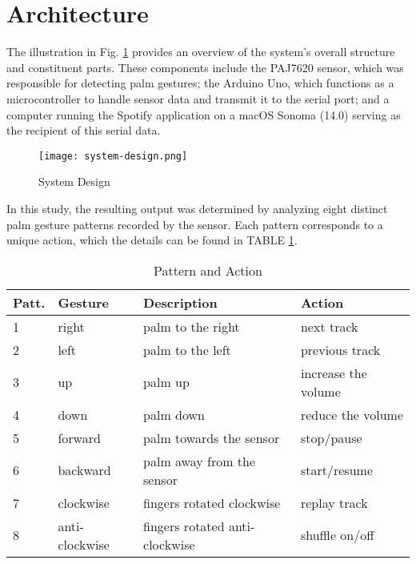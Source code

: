 \documentclass[conference,a4paper]{IEEEtran}
\begin{document}
\vspace{7pt}
\section{Architecture}
The illustration in Fig. \ref{fig:system-design} provides an overview of the system's overall structure and constituent parts. These components include the PAJ7620 sensor, which was responsible for detecting palm gestures; the Arduino Uno, which functions as a microcontroller to handle sensor data and transmit it to the serial port; and a computer running the Spotify application on a macOS Sonoma (14.0) serving as the recipient of this serial data.

\begin{figure}[!tbh]
    \centering
    \texttt{[image: system-design.png]}
    \caption{System Design}
    \label{fig:system-design}
\end{figure}

In this study, the resulting output was determined by analyzing eight distinct palm gesture patterns recorded by the sensor. Each pattern corresponds to a unique action, which the details can be found in TABLE \ref{table1}.

\begin{table}[!tbh]
  \centering
  \footnotesize %
  \caption{Pattern and Action}
  \begin{tabular}{p{0.3cm}p{1.65cm}p{3.4cm}p{2.25cm}}
     \toprule
     \normalfont Patt. & Gesture & Description & Action \\
     \midrule
      1 & right & palm to the right & next track\\ 
      2 & left & palm to the left & previous track\\ 
      3 & up & palm up& increase the volume\\ 
      4 & down & palm down& reduce the volume\\ 
      5 & forward & palm towards the sensor & stop/pause\\ 
      6 & backward& palm away from the sensor & start/resume\\  
      7 & clockwise& fingers rotated clockwise & replay track\\ 
      8 & anti-clockwise& fingers rotated anti-clockwise& shuffle on/off\\
     \bottomrule
  \end{tabular}
  \label{table1}
\end{table}
\end{document}
